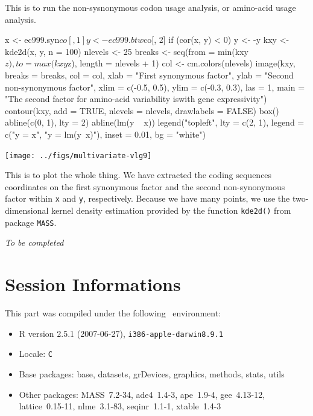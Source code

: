 \documentclass{article}
\begin{document}
This is to run the non-sysnonymous codon usage analysis, or amino-acid usage analysis.

\begin{Schunk}
\begin{Sinput}
 x <- ec999.syn$co[, 1]
 y <- ec999.btw$co[, 2]
 if (cor(x, y) < 0) y <- -y
 kxy <- kde2d(x, y, n = 100)
 nlevels <- 25
 breaks <- seq(from = min(kxy$z), to = max(kxy$z), length = nlevels + 
     1)
 col <- cm.colors(nlevels)
 image(kxy, breaks = breaks, col = col, xlab = "First synonymous factor", 
     ylab = "Second non-synonymous factor", xlim = c(-0.5, 
         0.5), ylim = c(-0.3, 0.3), las = 1, main = "The second factor for amino-acid variability is\ncorrelated with gene expressivity")
 contour(kxy, add = TRUE, nlevels = nlevels, drawlabels = FALSE)
 box()
 abline(c(0, 1), lty = 2)
 abline(lm(y ~ x))
 legend("topleft", lty = c(2, 1), legend = c("y = x", "y = lm(y~x)"), 
     inset = 0.01, bg = "white")
\end{Sinput}
\end{Schunk}
\texttt{[image: ../figs/multivariate-vlg9]}

This is to plot the whole thing. We have extracted the coding sequences coordinates
on the first synonymous factor and the second non-synonymous factor within
\texttt{x} and \texttt{y}, respectively. Because we have many points, we
use the two-dimensional kernel density estimation provided by the function
\texttt{kde2d()} from package \texttt{MASS}.


%
%

\textit{To be completed}




\section{Session Informations}

This part was compiled under the following \Rlogo{}~environment:

\begin{itemize}
  \item R version 2.5.1 (2007-06-27), \verb|i386-apple-darwin8.9.1|
  \item Locale: \verb|C|
  \item Base packages: base, datasets, grDevices, graphics, methods,
    stats, utils
  \item Other packages: MASS~7.2-34, ade4~1.4-3, ape~1.9-4,
    gee~4.13-12, lattice~0.15-11, nlme~3.1-83, seqinr~1.1-1,
    xtable~1.4-3
\end{itemize}


\clearpage
{}


\end{document}
